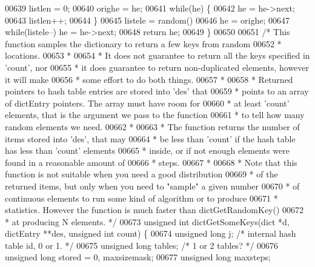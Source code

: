 \begin{DoxyCode}
00639     listlen = 0;
00640     orighe = he;
00641     \textcolor{keywordflow}{while}(he) \{
00642         he = he->next;
00643         listlen++;
00644     \}
00645     listele = random() %
00646     he = orighe;
00647     \textcolor{keywordflow}{while}(listele--) he = he->next;
00648     \textcolor{keywordflow}{return} he;
00649 \}
00650 
00651 \textcolor{comment}{/* This function samples the dictionary to return a few keys from random}
00652 \textcolor{comment}{ * locations.}
00653 \textcolor{comment}{ *}
00654 \textcolor{comment}{ * It does not guarantee to return all the keys specified in 'count', nor}
00655 \textcolor{comment}{ * it does guarantee to return non-duplicated elements, however it will make}
00656 \textcolor{comment}{ * some effort to do both things.}
00657 \textcolor{comment}{ *}
00658 \textcolor{comment}{ * Returned pointers to hash table entries are stored into 'des' that}
00659 \textcolor{comment}{ * points to an array of dictEntry pointers. The array must have room for}
00660 \textcolor{comment}{ * at least 'count' elements, that is the argument we pass to the function}
00661 \textcolor{comment}{ * to tell how many random elements we need.}
00662 \textcolor{comment}{ *}
00663 \textcolor{comment}{ * The function returns the number of items stored into 'des', that may}
00664 \textcolor{comment}{ * be less than 'count' if the hash table has less than 'count' elements}
00665 \textcolor{comment}{ * inside, or if not enough elements were found in a reasonable amount of}
00666 \textcolor{comment}{ * steps.}
00667 \textcolor{comment}{ *}
00668 \textcolor{comment}{ * Note that this function is not suitable when you need a good distribution}
00669 \textcolor{comment}{ * of the returned items, but only when you need to "sample" a given number}
00670 \textcolor{comment}{ * of continuous elements to run some kind of algorithm or to produce}
00671 \textcolor{comment}{ * statistics. However the function is much faster than dictGetRandomKey()}
00672 \textcolor{comment}{ * at producing N elements. */}
00673 \textcolor{keywordtype}{unsigned} \textcolor{keywordtype}{int} dictGetSomeKeys(dict *d, dictEntry **des, \textcolor{keywordtype}{unsigned} \textcolor{keywordtype}{int} count) \{
00674     \textcolor{keywordtype}{unsigned} \textcolor{keywordtype}{long} j; \textcolor{comment}{/* internal hash table id, 0 or 1. */}
00675     \textcolor{keywordtype}{unsigned} \textcolor{keywordtype}{long} tables; \textcolor{comment}{/* 1 or 2 tables? */}
00676     \textcolor{keywordtype}{unsigned} \textcolor{keywordtype}{long} stored = 0, maxsizemask;
00677     \textcolor{keywordtype}{unsigned} \textcolor{keywordtype}{long} maxsteps;

\end{DoxyCode}
